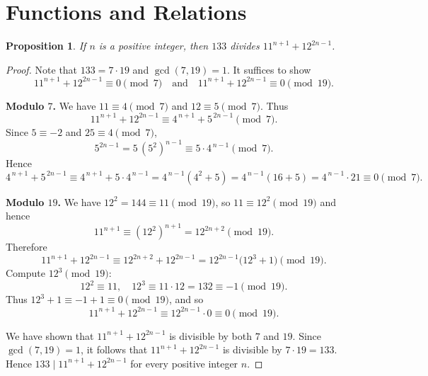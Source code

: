 \documentclass{article}
\title{}
\author{}
\date{}
\theoremstyle{plain}
\newtheorem{proposition}{Proposition}
\theoremstyle{definition}
\theoremstyle{remark}
\begin{document}
\maketitle

\section{Functions and Relations}
\begin{proposition}
If $n$ is a positive integer, then $133$ divides $11^{n+1}+12^{2n-1}$.
\end{proposition}

\begin{proof}
Note that $133=7\cdot 19$ and $\gcd(7,19)=1$. It suffices to show
\[
11^{n+1}+12^{2n-1}\equiv 0 \pmod 7
\quad\text{and}\quad
11^{n+1}+12^{2n-1}\equiv 0 \pmod{19}.
\]

\textbf{Modulo $7$.}
We have $11\equiv 4\pmod 7$ and $12\equiv 5\pmod 7$. Thus
\[
11^{n+1}+12^{2n-1}
\equiv 4^{\,n+1} + 5^{\,2n-1} \pmod 7.
\]
Since $5\equiv -2$ and $25\equiv 4\pmod 7$,
\[
5^{2n-1} = 5\,(5^2)^{n-1} \equiv 5\cdot 4^{\,n-1}\pmod 7.
\]
Hence
\[
4^{\,n+1}+5^{\,2n-1}
\equiv 4^{\,n+1}+5\cdot 4^{\,n-1}
=4^{\,n-1}(4^2+5)
=4^{\,n-1}(16+5)
=4^{\,n-1}\cdot 21 \equiv 0 \pmod 7.
\]

\textbf{Modulo $19$.}
We have $12^2=144\equiv 11\pmod{19}$, so $11\equiv 12^2\pmod{19}$ and hence
\[
11^{n+1} \equiv (12^2)^{n+1} = 12^{2n+2}\pmod{19}.
\]
Therefore
\[
11^{n+1}+12^{2n-1}
\equiv 12^{2n+2}+12^{2n-1}
=12^{2n-1}\bigl(12^3+1\bigr)\pmod{19}.
\]
Compute $12^3\pmod{19}$:
\[
12^2\equiv 11,\quad 12^3\equiv 11\cdot 12 = 132 \equiv -1 \pmod{19}.
\]
Thus $12^3+1\equiv -1+1\equiv 0\pmod{19}$, and so
\[
11^{n+1}+12^{2n-1}\equiv 12^{2n-1}\cdot 0 \equiv 0\pmod{19}.
\]

We have shown that $11^{n+1}+12^{2n-1}$ is divisible by both $7$ and $19$.
Since $\gcd(7,19)=1$, it follows that $11^{n+1}+12^{2n-1}$ is divisible by
$7\cdot 19=133$. Hence $133\mid 11^{n+1}+12^{2n-1}$ for every positive
integer $n$.
\end{proof}
\end{document}
